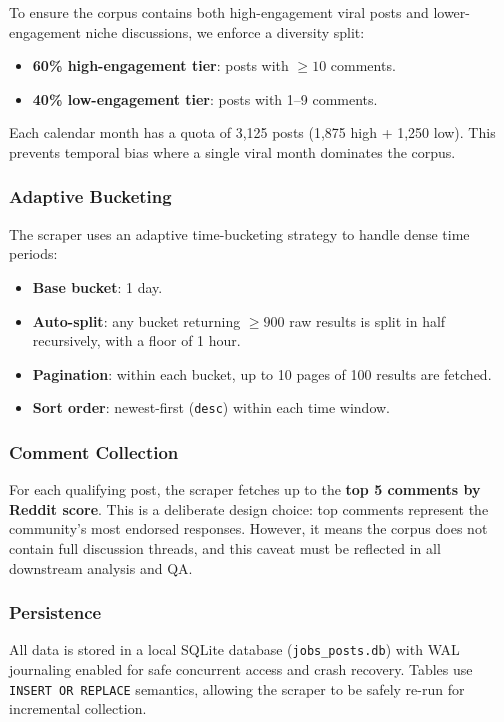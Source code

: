 \documentclass[11pt,a4paper]{article}
\begin{document}
To ensure the corpus contains both high-engagement viral posts and lower-engagement niche discussions, we enforce a diversity split:
\begin{itemize}[leftmargin=*]
  \item \textbf{60\% high-engagement tier}: posts with $\geq 10$ comments.
  \item \textbf{40\% low-engagement tier}: posts with 1--9 comments.
\end{itemize}

Each calendar month has a quota of 3,125 posts (1,875 high + 1,250 low). This prevents temporal bias where a single viral month dominates the corpus.

\subsubsection{Adaptive Bucketing}

The scraper uses an adaptive time-bucketing strategy to handle dense time periods:
\begin{itemize}[leftmargin=*]
  \item \textbf{Base bucket}: 1 day.
  \item \textbf{Auto-split}: any bucket returning $\geq 900$ raw results is split in half recursively, with a floor of 1 hour.
  \item \textbf{Pagination}: within each bucket, up to 10 pages of 100 results are fetched.
  \item \textbf{Sort order}: newest-first (\texttt{desc}) within each time window.
\end{itemize}

\subsubsection{Comment Collection}

For each qualifying post, the scraper fetches up to the \textbf{top 5 comments by Reddit score}. This is a deliberate design choice: top comments represent the community's most endorsed responses. However, it means the corpus does not contain full discussion threads, and this caveat must be reflected in all downstream analysis and QA.

\subsubsection{Persistence}

All data is stored in a local SQLite database (\texttt{jobs\_posts.db}) with WAL journaling enabled for safe concurrent access and crash recovery. Tables use \texttt{INSERT OR REPLACE} semantics, allowing the scraper to be safely re-run for incremental collection.
\end{document}
